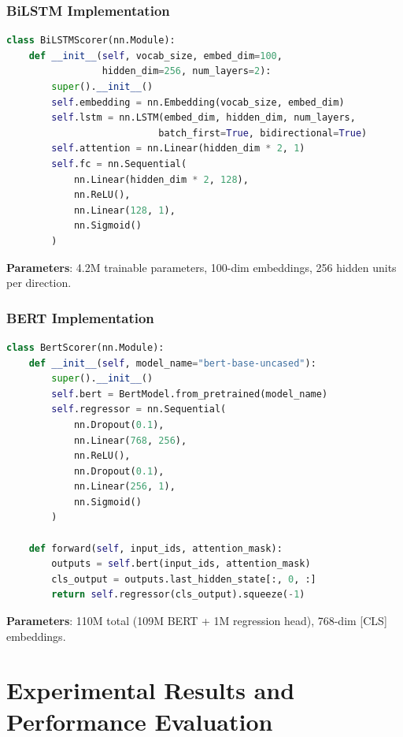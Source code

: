 \documentclass[12pt,a4paper]{article}
\begin{document}
\subsubsection{BiLSTM Implementation}
\begin{lstlisting}[language=Python, caption=BiLSTM Model Architecture]
class BiLSTMScorer(nn.Module):
    def __init__(self, vocab_size, embed_dim=100, 
                 hidden_dim=256, num_layers=2):
        super().__init__()
        self.embedding = nn.Embedding(vocab_size, embed_dim)
        self.lstm = nn.LSTM(embed_dim, hidden_dim, num_layers,
                           batch_first=True, bidirectional=True)
        self.attention = nn.Linear(hidden_dim * 2, 1)
        self.fc = nn.Sequential(
            nn.Linear(hidden_dim * 2, 128),
            nn.ReLU(),
            nn.Linear(128, 1),
            nn.Sigmoid()
        )
\end{lstlisting}

\textbf{Parameters}: 4.2M trainable parameters, 100-dim embeddings, 256 hidden units per direction.

\subsubsection{BERT Implementation}
\begin{lstlisting}[language=Python, caption=BERT Regression Model]
class BertScorer(nn.Module):
    def __init__(self, model_name="bert-base-uncased"):
        super().__init__()
        self.bert = BertModel.from_pretrained(model_name)
        self.regressor = nn.Sequential(
            nn.Dropout(0.1),
            nn.Linear(768, 256),
            nn.ReLU(),
            nn.Dropout(0.1),
            nn.Linear(256, 1),
            nn.Sigmoid()
        )
    
    def forward(self, input_ids, attention_mask):
        outputs = self.bert(input_ids, attention_mask)
        cls_output = outputs.last_hidden_state[:, 0, :]
        return self.regressor(cls_output).squeeze(-1)
\end{lstlisting}

\textbf{Parameters}: 110M total (109M BERT + 1M regression head), 768-dim [CLS] embeddings.

\newpage
\section{Experimental Results and Performance Evaluation}
\end{document}
